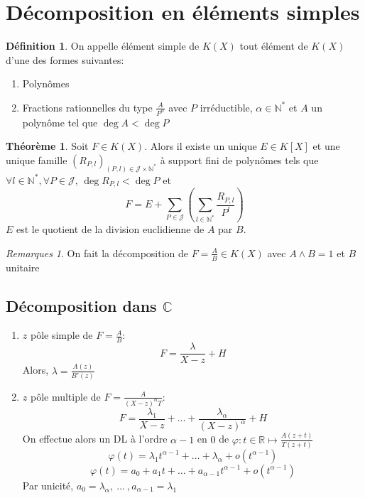\documentclass[fleqn]{article}
\theoremstyle{definition} \newtheorem*{defi}{D\'efinition}
\theoremstyle{definition} \newtheorem*{theo}{Th\'eor\`eme}
\theoremstyle{definition} \newtheorem*{coro}{Corollaire}
\theoremstyle{definition} \newtheorem*{nota}{Notation}
\theoremstyle{remark} \newtheorem*{rqs}{Remarques}
\theoremstyle{definition} \newtheorem*{prop}{Propri\'et\'e}
\begin{document}
\section{D\'ecomposition en \'el\'ements simples}
\begin{defi}
	On appelle \'el\'ement simple de $K(X)$ tout \'el\'ement de $K(X)$ d'une des formes suivantes:
	\begin{enumerate}
		\item Polyn\^omes
		\item Fractions rationnelles du type $\frac{A}{P^\alpha}$ avec $P$ irr\'eductible, $\alpha \in \mathbb{N}^*$ et $A$ un polyn\^ome tel que
			$\deg A < \deg P$
	\end{enumerate}
\end{defi}

\begin{theo}
	Soit $F \in K(X)$. Alors il existe un unique $E \in K[X]$ et une unique famille $(R_{P,l})_{(P,l) \in \mathcal{J} \times \mathbb{N}^*}$
	\`a support fini de polyn\^omes tels que \mbox{$\forall l \in \mathbb{N}^*, \forall P \in \mathcal{J}$}, $\deg R_{P,l} < \deg P$ et
	\[F = E + \sum_{P \in \mathcal{J}} \left(\sum_{l \in \mathbb{N}^*} \frac{R_{P,l}}{P^l}\right)\]
	$E$ est le quotient de la division euclidienne de $A$ par $B$.
\end{theo}

\begin{rqs}
	On fait la d\'ecomposition de $F = \frac{A}{B} \in K(X)$ avec $A \land B = 1$ et $B$ unitaire
\end{rqs}

\subsection{D\'ecomposition dans $\mathbb{C}$}
\begin{enumerate}
	\item $z$ p\^ole simple de $F=\frac{A}{B}$:
		\[F = \frac{\lambda}{X -z} + H\]
		Alors, $\lambda = \frac{A(z)}{B'(z)}$
	\item $z$ p\^ole multiple de $F= \frac{A}{(X-z)^\alpha T}$:
		\[F = \frac{\lambda_1}{X-z} + \hdots + \frac{\lambda_\alpha}{(X-z)^\alpha} + H\]
		On effectue alors un DL \`a l'ordre $\alpha -1$ en $0$ de $\varphi: t\in \mathbb{R} \mapsto \frac{A(z+t)}{T(z+t)}$
		\[\varphi(t) = \lambda_1 t^{\alpha -1} + \hdots + \lambda_\alpha + o(t^{\alpha -1})\]
		\[\varphi(t) = a_0 + a_1 t + \hdots + a_{\alpha -1} t^{\alpha -1} + o(t^{\alpha -1})\]
		Par unicit\'e, $a_0 = \lambda_\alpha,\ \hdots\ , a_{\alpha-1} = \lambda_1$
\end{enumerate}
\end{document}
